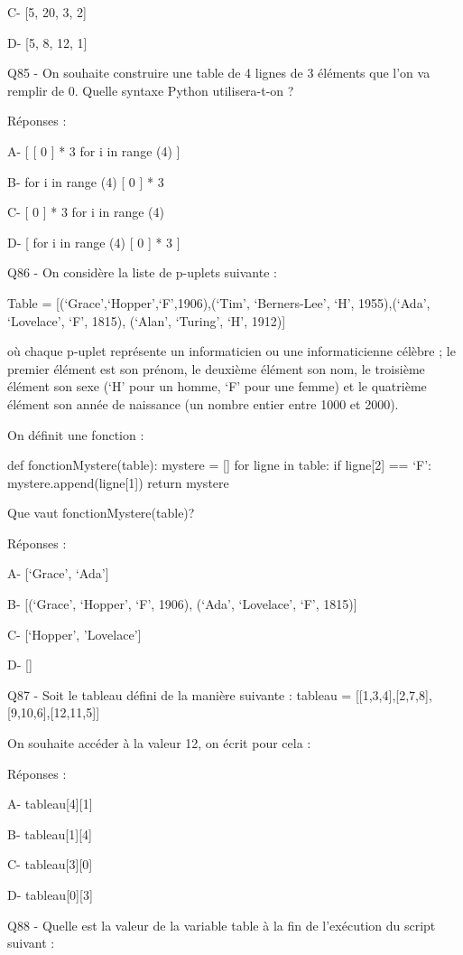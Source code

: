 \documentclass[
]{book}
\begin{document}
C- {[}5, 20, 3, 2{]}

D- {[}5, 8, 12, 1{]}

Q85 - On souhaite construire une table de 4 lignes de 3 éléments que l'on va remplir de 0. Quelle syntaxe Python utilisera-t-on ?

Réponses :

A- {[} {[} 0 {]} * 3 for i in range (4) {]}

B- for i in range (4) {[} 0 {]} * 3

C- {[} 0 {]} * 3 for i in range (4)

D- {[} for i in range (4) {[} 0 {]} * 3 {]}

Q86 - On considère la liste de p-uplets suivante :

Table = {[}(`Grace',`Hopper',`F',1906),(`Tim', `Berners-Lee', `H', 1955),(`Ada', `Lovelace', `F', 1815), (`Alan', `Turing', `H', 1912){]}

où chaque p-uplet représente un informaticien ou une informaticienne célèbre ; le premier élément est son prénom, le deuxième élément son nom, le troisième élément son sexe (`H' pour un homme, `F' pour une femme) et le quatrième élément son année de naissance (un nombre entier entre 1000 et 2000).

On définit une fonction :

def fonctionMystere(table):
mystere = {[}{]}
for ligne in table:
if ligne{[}2{]} == `F':
mystere.append(ligne{[}1{]})
return mystere

Que vaut fonctionMystere(table)?

Réponses :

A- {[}`Grace', `Ada'{]}

B- {[}(`Grace', `Hopper', `F', 1906), (`Ada', `Lovelace', `F', 1815){]}

C- {[}`Hopper', 'Lovelace'{]}

D- {[}{]}

Q87 - Soit le tableau défini de la manière suivante : tableau = {[}{[}1,3,4{]},{[}2,7,8{]},{[}9,10,6{]},{[}12,11,5{]}{]}

On souhaite accéder à la valeur 12, on écrit pour cela :

Réponses :

A- tableau{[}4{]}{[}1{]}

B- tableau{[}1{]}{[}4{]}

C- tableau{[}3{]}{[}0{]}

D- tableau{[}0{]}{[}3{]}

Q88 - Quelle est la valeur de la variable table à la fin de l'exécution du script suivant :
\end{document}
